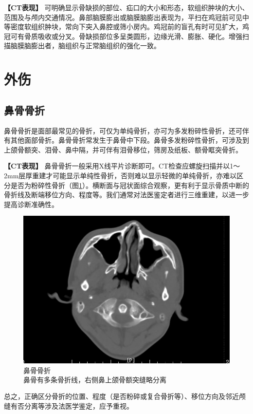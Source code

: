 \textbf{【CT表现】}
可明确显示骨缺损的部位、疝口的大小和形态，软组织肿块的大小、范围及与颅内交通情况。鼻部脑膜膨出或脑膜脑膨出表现为，平扫在鸡冠前可见中等密度软组织肿块，常向下突入鼻腔或筛小房内。鸡冠前的盲孔有时可见扩大，鸡冠可有骨质吸收或分叉。骨缺损部位多呈类圆形，边缘光滑、膨胀、硬化。增强扫描脑膜脑膨出者，脑组织与正常脑组织的强化一致。

\section{外伤}

\subsection{鼻骨骨折}

鼻骨骨折是面部最常见的骨折，可仅为单纯骨折，亦可为多发粉碎性骨折，还可伴有其他面部骨折。鼻骨骨折常发生于鼻骨中下段。鼻骨多发粉碎性骨折，可涉及到上颌骨额突、泪骨、鼻中隔，并可伴有泪骨移位，筛房及纸板、额骨眶突骨折。

\textbf{【CT表现】}
鼻骨骨折一般采用X线平片诊断即可。CT检查应螺旋扫描并以1～2mm层厚重建才可能显示单纯性骨折，否则难以显示轻微的单纯骨折，亦难以区分是否为粉碎性骨折（图\ref{fig5-2}）。横断面与冠状面综合观察，更有利于显示骨质中断的骨折线及断端移位方向、程度等。我们通常对法医鉴定者进行三维重建，以进一步提高诊断准确性。

\begin{figure}[!htbp]
 \centering
 \includegraphics[width=.7\textwidth,height=\textheight,keepaspectratio]{./images/Image00123.jpg}
 \captionsetup{justification=centering}
 \caption{鼻骨骨折\\{\small 鼻骨有多条骨折线，右侧鼻上颌骨额突缝略分离}}
 \label{fig5-2}
  \end{figure} 

总之，正确区分骨折的位置、程度（是否粉碎或复合骨折等）、移位方向及邻近颅缝有否分离等涉及法医学鉴定，应予重视。

